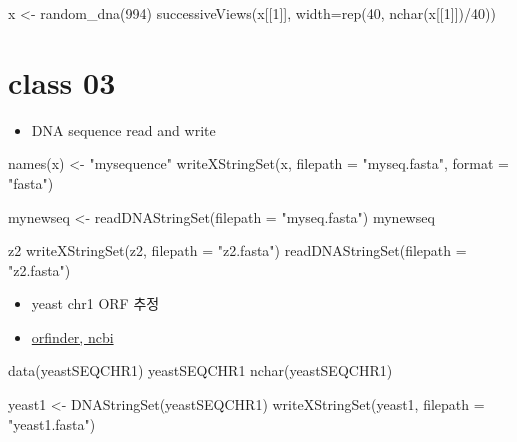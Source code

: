 \documentclass[
]{book}
\newenvironment{Shaded}{\begin{snugshade}}{\end{snugshade}}
\newcommand{\AttributeTok}[1]{\textcolor[rgb]{0.77,0.63,0.00}{#1}}
\newcommand{\DecValTok}[1]{\textcolor[rgb]{0.00,0.00,0.81}{#1}}
\newcommand{\FunctionTok}[1]{\textcolor[rgb]{0.00,0.00,0.00}{#1}}
\newcommand{\NormalTok}[1]{#1}
\newcommand{\OtherTok}[1]{\textcolor[rgb]{0.56,0.35,0.01}{#1}}
\newcommand{\SpecialCharTok}[1]{\textcolor[rgb]{0.00,0.00,0.00}{#1}}
\newcommand{\StringTok}[1]{\textcolor[rgb]{0.31,0.60,0.02}{#1}}
\providecommand{\tightlist}{%
  \setlength{\itemsep}{0pt}\setlength{\parskip}{0pt}}
\begin{document}
\begin{Shaded}
\begin{Highlighting}[]
\NormalTok{x }\OtherTok{\textless{}{-}} \FunctionTok{random\_dna}\NormalTok{(}\DecValTok{994}\NormalTok{)}
\FunctionTok{successiveViews}\NormalTok{(x[[}\DecValTok{1}\NormalTok{]], }\AttributeTok{width=}\FunctionTok{rep}\NormalTok{(}\DecValTok{40}\NormalTok{, }\FunctionTok{nchar}\NormalTok{(x[[}\DecValTok{1}\NormalTok{]])}\SpecialCharTok{/}\DecValTok{40}\NormalTok{))}
\end{Highlighting}
\end{Shaded}

\hypertarget{class-03-2}{%
\section{class 03}\label{class-03-2}}

\begin{itemize}
\tightlist
\item
  DNA sequence read and write
\end{itemize}

\begin{Shaded}
\begin{Highlighting}[]
\FunctionTok{names}\NormalTok{(x) }\OtherTok{\textless{}{-}} \StringTok{"mysequence"}
\FunctionTok{writeXStringSet}\NormalTok{(x, }\AttributeTok{filepath =} \StringTok{"myseq.fasta"}\NormalTok{, }\AttributeTok{format =} \StringTok{"fasta"}\NormalTok{)}

\NormalTok{mynewseq }\OtherTok{\textless{}{-}} \FunctionTok{readDNAStringSet}\NormalTok{(}\AttributeTok{filepath =} \StringTok{"myseq.fasta"}\NormalTok{)}
\NormalTok{mynewseq}

\NormalTok{z2}
\FunctionTok{writeXStringSet}\NormalTok{(z2, }\AttributeTok{filepath =} \StringTok{"z2.fasta"}\NormalTok{)}
\FunctionTok{readDNAStringSet}\NormalTok{(}\AttributeTok{filepath =} \StringTok{"z2.fasta"}\NormalTok{)}
\end{Highlighting}
\end{Shaded}

\begin{itemize}
\tightlist
\item
  yeast chr1 ORF 추정
\item
  \href{https://www.ncbi.nlm.nih.gov/orffinder/}{orfinder, ncbi}
\end{itemize}

\begin{Shaded}
\begin{Highlighting}[]
\FunctionTok{data}\NormalTok{(yeastSEQCHR1)}
\NormalTok{yeastSEQCHR1}
\FunctionTok{nchar}\NormalTok{(yeastSEQCHR1)}

\NormalTok{yeast1 }\OtherTok{\textless{}{-}} \FunctionTok{DNAStringSet}\NormalTok{(yeastSEQCHR1)}
\FunctionTok{writeXStringSet}\NormalTok{(yeast1, }\AttributeTok{filepath =} \StringTok{"yeast1.fasta"}\NormalTok{)}
\end{Highlighting}
\end{Shaded}
\end{document}
